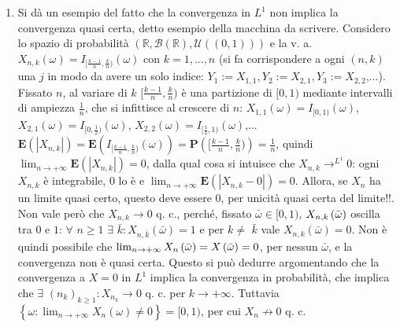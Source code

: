 \documentclass{article}
\begin{document}
\begin{enumerate}
\item Si d\`{a} un esempio del fatto che la convergenza in $L^{1}$ non
implica la convergenza quasi certa, detto esempio della macchina da
scrivere. Considero lo spazio di probabilit\`{a} $\left( 
\mathbb{R}
,\mathcal{B}\left( 
\mathbb{R}
\right) ,\mathcal{U}\left( \left( 0,1\right) \right) \right) $ e la v. a. $%
X_{n,k}\left( \omega \right) =I_{[\frac{k-1}{n},\frac{k}{n})}\left( \omega
\right) $ con $k=1,...,n$ (si fa corrispondere a ogni $\left( n,k\right) $
una $j$ in modo da avere un solo indice: $%
Y_{1}:=X_{1,1},Y_{2}:=X_{2,1},Y_{3}:=X_{2,2}$,...). Fissato $n$, al variare
di $k$ $[\frac{k-1}{n},\frac{k}{n})$ \`{e} una partizione di $[0,1)$
mediante intervalli di ampiezza $\frac{1}{n}$, che si infittisce al crescere
di $n$: $X_{1,1}\left( \omega \right) =I_{[0,1)}\left( \omega \right) $, $%
X_{2,1}\left( \omega \right) =I_{[0,\frac{1}{2})}\left( \omega \right) $, $%
X_{2,2}\left( \omega \right) =I_{[\frac{1}{2},1)}\left( \omega \right) $,... 
$\mathbf{E}\left( \left\vert X_{n,k}\right\vert \right) =\mathbf{E}\left(
I_{[\frac{k-1}{n},\frac{k}{n})}\left( \omega \right) \right) =\mathbf{P}%
\left( [\frac{k-1}{n},\frac{k}{n})\right) =\frac{1}{n}$, quindi $%
\lim_{n\rightarrow +\infty }\mathbf{E}\left( \left\vert X_{n,k}\right\vert
\right) =0$, dalla qual cosa si intuisce che $X_{n,k}\rightarrow ^{L^{1}}0$:
ogni $X_{n,k}$ \`{e} integrabile, $0$ lo \`{e} e $\lim_{n\rightarrow +\infty
}\mathbf{E}\left( \left\vert X_{n,k}-0\right\vert \right) =0$. Allora, se $%
X_{n}$ ha un limite quasi certo, questo deve essere $0$, per unicit\`{a}
quasi certa del limite!!. Non vale per\`{o} che $X_{n,k}\rightarrow 0$ q.
c., perch\'{e}, fissato $\bar{\omega}\in \lbrack 0,1)$, $X_{n,k}\left( \bar{%
\omega}\right) $ oscilla tra $0$ e $1$: $\forall $ $n\geq 1$ $\exists $ $%
\bar{k}:X_{n,\bar{k}}\left( \bar{\omega}\right) =1$ e per $k\neq $ $\bar{k}$
vale $X_{n,k}\left( \bar{\omega}\right) =0$. Non \`{e} quindi possibile che $%
\lim_{n\rightarrow +\infty }X_{n}\left( \bar{\omega}\right) =X\left( \bar{%
\omega}\right) =0$, per nessun $\bar{\omega}$, e la convergenza non \`{e}
quasi certa. Questo si pu\`{o} dedurre argomentando che la convergenza a $%
X=0 $ in $L^{1}$ implica la convergenza in probabilit\`{a}, che implica che $%
\exists $ $\left( n_{k}\right) _{k\geq 1}:X_{n_{k}}\rightarrow 0$ q. c. per $%
k\rightarrow +\infty $. Tuttavia $\left\{ \omega :\lim_{n\rightarrow +\infty
}X_{n}\left( \omega \right) \neq 0\right\} =[0,1)$, per cui $%
X_{n}\not\rightarrow 0$ q. c.


\end{enumerate}
\end{document}
